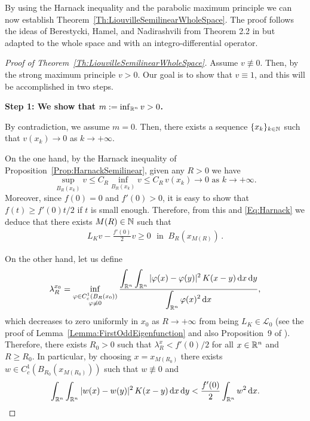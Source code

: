 

By using the Harnack inequality and the parabolic maximum principle we can now establish Theorem~\ref{Th:LiouvilleSemilinearWholeSpace}. The proof follows the ideas of Berestycki, Hamel, and Nadirashvili from Theorem 2.2 in \cite{BerestyckiHamelNadi} but adapted to the whole space and with an integro-differential operator.

\begin{proof}[Proof of Theorem~\ref{Th:LiouvilleSemilinearWholeSpace}]


Assume $v\not\equiv 0$. Then, by the strong maximum principle $v>0$. Our goal is to show that $v\equiv 1$, and this will be accomplished in two steps.

\textbf{Step 1: We show that $m:=\inf_{\mathbb{R}^n} v >0$.} 

By contradiction, we assume $m=0$. Then, there exists a sequence $\{x_k\}_{k\in\mathbb{N}}$ such that $v(x_k)\rightarrow 0$ as $k \rightarrow +\infty$.

On the one hand, by the Harnack inequality of Proposition~\ref{Prop:HarnackSemilinear}, given any $R>0$ we have 
\begin{equation}
\label{Eq:Harnack}
\sup_{B_R(x_k)}v \leq C_R \inf_{B_R(x_k)}v \leq C_R \, v(x_k) \rightarrow 0 \,\,\text{as}\,\, k\rightarrow +\infty.
\end{equation}
Moreover, since $f(0) = 0 $ and $f'(0)>0$, it is easy to show that $f(t)\geq f'(0)t/2$ if $t$ is small enough. Therefore, from this and \eqref{Eq:Harnack}  we deduce that there exists $M(R)\in\mathbb{N}$ such that
\begin{align}
\label{Eq:WholeSpace2}
L_K  v - \frac{f'(0)}{2}v \geq 0 \,\,\textrm{ in }\ B_R(x_{M(R)})\,.
\end{align}


On the other hand, let us define
$$  \lambda_R^{x_0} = \inf_{\substack{\varphi\in C^1_c(B_R(x_0))\\ \varphi\not\equiv 0}} \frac{\displaystyle \int_{\mathbb{R}^n}\int_{\mathbb{R}^n}|\varphi(x)-\varphi(y)|^2\,K(x-y) \,\mathrm{d} x \,\mathrm{d} y}{\displaystyle \int_{\mathbb{R}^n}\varphi(x)^2 \,\mathrm{d} x}, 
$$
which decreases to zero uniformly in $x_0$ as $R\to +\infty$ from being $L_K \in\mathcal{L}_0$ (see the proof of Lemma~\ref{Lemma:FirstOddEigenfunction} and also Proposition~9 of \cite{ServadeiValdinoci}). Therefore, there exists $R_0>0$ such that $ \lambda_R^x < f'(0)/2$ for all $x\in \mathbb{R}^n$ and $R\geq R_0$. In particular, by choosing $x=x_{M(R_0)}$ there exists $w\in C^1_c(B_{R_0}(x_{M(R_0)}))$ such that $w\not\equiv 0$ and
\begin{equation}
\label{Eq:Eigenfunction}
\int_{\mathbb{R}^n}\int_{\mathbb{R}^n}|w(x)-w(y)|^2\,K(x-y) \,\mathrm{d} x \,\mathrm{d} y < \frac{f'(0)}{2}\int_{\mathbb{R}^n}w^2 \,\mathrm{d} x.
\end{equation}


\end{proof}

